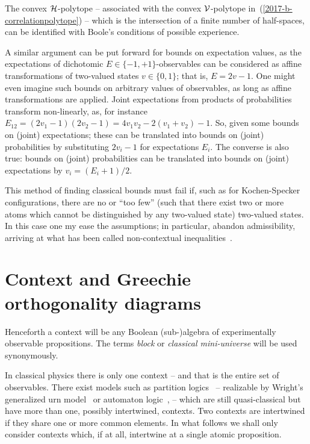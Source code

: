 \documentclass[%
  twocolumn,
 showpacs,
 showkeys,
 preprintnumbers,
 amsmath,amssymb,
 aps,
  pra,
  longbibliography,
 floatfix,
 ]{revtex4-1}
\begin{document}
The convex ${\cal H}$-polytope -- associated with the convex ${\cal V}$-polytope in~(\ref{2017-b-correlationpolytope}) --
which is the intersection of a finite number of half-spaces,  can be identified with Boole's conditions of possible
experience.


A similar argument can be put forward for bounds on expectation values, as
the expectations of dichotomic $E   \in \{-1,+1\}$-observables can be considered as affine transformations
of two-valued states $v  \in \{0,1\}$; that is, $E = 2 v - 1$.
One might even imagine such bounds on arbitrary values of observables, as long as affine transformations are applied.
Joint expectations from products of probabilities transform non-linearly, as,
for instance  $E_{12}= (2v_1-1)(2v_2-1)= 4 v_1v_2 - 2(v_1+v_2)-1$.
So, given some bounds on (joint) expectations; these can be translated into bounds on (joint) probabilities
by substituting $2 v_i - 1$ for expectations $E_i$.
The converse is also true:  bounds on (joint) probabilities can be translated into bounds on (joint)
expectations by $v_i = (E_i +1)/2$.

This method of finding classical bounds must fail if, such as for  Kochen-Specker configurations, there are no or ``too few''
(such that there exist two or more atoms which cannot be distinguished by any two-valued state)
two-valued states.
In this case one my ease the assumptions; in particular, abandon admissibility, arriving at what has been called
non-contextual inequalities~\cite{cabello:210401}.

\section{Context and Greechie orthogonality diagrams}
\label{2017-b-cagod}

Henceforth a context will be any Boolean (sub-)algebra of experimentally observable propositions.
The terms {\em block} or {\em classical mini-universe} will be used synonymously.

In classical physics there is only one context -- and that is the entire set of observables.
There exist models such as partition logics~\cite{dvur-pul-svo,svozil-2001-eua,svozil-2008-ql}
-- realizable by Wright's generalized urn model~\cite{wright} or automaton logic~\cite{schaller-92,svozil-93,schaller-95,schaller-96},
-- which are still quasi-classical but have more than one, possibly intertwined, contexts.
Two contexts are intertwined if they share one or more common elements.
In what follows we shall only consider contexts which, if at all, intertwine at a single atomic proposition.
\end{document}
